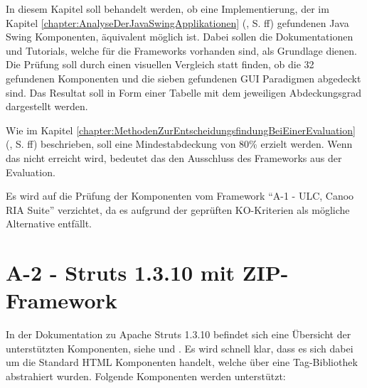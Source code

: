 In diesem Kapitel soll behandelt werden, ob eine Implementierung, der im Kapitel 
\ref{chapter:AnalyseDerJavaSwingApplikationen}
(, S.
\pageref{chapter:AnalyseDerJavaSwingApplikationen}ff) gefundenen Java Swing
Komponenten, äquivalent möglich ist. Dabei sollen die Dokumentationen und
Tutorials, welche für die Frameworks vorhanden sind, als Grundlage dienen. Die
Prüfung soll durch einen visuellen Vergleich statt finden, ob die 32 gefundenen
Komponenten und die sieben gefundenen GUI Paradigmen abgedeckt sind. Das
Resultat soll in Form einer Tabelle mit dem jeweiligen Abdeckungsgrad
dargestellt werden.

Wie im Kapitel \ref{chapter:MethodenZurEntscheidungsfindungBeiEinerEvaluation}
(, S.
\pageref{chapter:MethodenZurEntscheidungsfindungBeiEinerEvaluation}ff)
beschrieben, soll eine Mindestabdeckung von 80\% erzielt werden. Wenn das nicht
erreicht wird, bedeutet das den Ausschluss des Frameworks aus der Evaluation.

Es wird auf die Prüfung der Komponenten vom Framework ``A-1 - ULC, Canoo RIA
Suite'' verzichtet, da es aufgrund der geprüften KO-Kriterien als mögliche
Alternative entfällt.

\section{A-2 - Struts 1.3.10 mit ZIP-Framework}

In der Dokumentation zu Apache Struts 1.3.10 befindet sich eine Übersicht der
unterstützten Komponenten, siehe \cite{StrutsComponentes} und
\cite{StrutsHtmlTag}. Es wird schnell klar, dass es sich dabei um die Standard
\ac{HTML} Komponenten handelt, welche über eine Tag-Bibliothek abstrahiert
wurden. Folgende Komponenten werden unterstützt:


